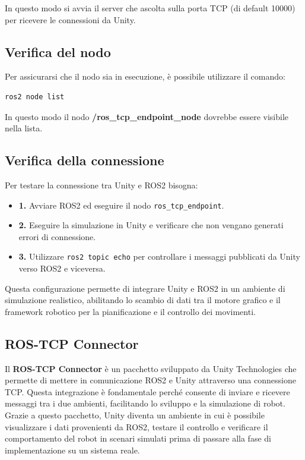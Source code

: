 \documentclass[11pt]{report}
\begin{document}
In questo modo si avvia il server che ascolta sulla porta TCP (di default 10000) per ricevere le connessioni da Unity.

\subsection*{\textbf{Verifica del nodo}}
Per assicurarsi che il nodo sia in esecuzione, è possibile utilizzare il comando: \begin{verbatim}
ros2 node list
\end{verbatim}

In questo modo il nodo \textbf{/ros\_tcp\_endpoint\_node} dovrebbe essere visibile nella lista.

\subsection*{\textbf{Verifica della connessione}}

Per testare la connessione tra Unity e ROS2 bisogna:

\begin{itemize}
    \item \textbf{1.} Avviare ROS2 ed eseguire il nodo \texttt{ros\_tcp\_endpoint}.
    \item \textbf{2.} Eseguire la simulazione in Unity e verificare che non vengano generati errori di connessione.
    \item \textbf{3.} Utilizzare \texttt{ros2 topic echo} per controllare i messaggi pubblicati da Unity verso ROS2 e viceversa.
\end{itemize}

Questa configurazione permette di integrare Unity e ROS2 in un ambiente di simulazione realistico, abilitando lo scambio di dati tra il motore grafico e il framework robotico per la pianificazione e il controllo dei movimenti.

\subsection*{\textbf{ROS-TCP Connector}}

Il \textbf{ROS-TCP Connector} è un pacchetto sviluppato da Unity Technologies che permette di mettere in comunicazione ROS2 e Unity attraverso una connessione TCP. Questa integrazione è fondamentale perché consente di inviare e ricevere messaggi tra i due ambienti, facilitando lo sviluppo e la simulazione di robot. Grazie a questo pacchetto, Unity diventa un ambiente in cui è possibile visualizzare i dati provenienti da ROS2, testare il controllo e verificare il comportamento del robot in scenari simulati prima di passare alla fase di implementazione su un sistema reale.
\end{document}
